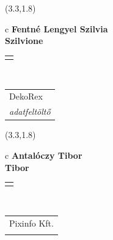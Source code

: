 \documentclass[11pt]{article}
\begin{document}
\makebox(3.3,1.8){
  \renewcommand\arraystretch{1.3}
  \begin{tabular}[c]{c}
    \hspace{8.5mm}
    \LARGE\bf{ Fentné Lengyel Szilvia }\\
    \hspace{8.5mm}
    \Large{ Szilvione }\\
    \renewcommand\arraystretch{3}
    \begin{tabular}[c]{c}
      \centering
      \fontfamily{phv}\selectfont{
        \textbf{
          \textsc{
            \scriptsize{
            \color{Dark}{ Ismerkedő }\color{Bright}{ Webmester }\color{Bright}{ Sminkmester }\color{Bright}{ Programozó }
            }
          }
        }
      }
    \end{tabular}
    \\
    \renewcommand\arraystretch{1}
    \begin{tabular}{p{3.3in}}
      \hspace{.7cm}DekoRex\\
      \hspace{.7cm}\emph{ adatfeltöltő }\\
    \end{tabular}
  \end{tabular}
}

\makebox(3.3,1.8){
  \renewcommand\arraystretch{1.3}
  \begin{tabular}[c]{c}
    \hspace{8.5mm}
    \LARGE\bf{ Antalóczy Tibor }\\
    \hspace{8.5mm}
    \Large{ Tibor }\\
    \renewcommand\arraystretch{3}
    \begin{tabular}[c]{c}
      \centering
      \fontfamily{phv}\selectfont{
        \textbf{
          \textsc{
            \scriptsize{
            \color{Dark}{ Ismerkedő }\color{Bright}{ Webmester }\color{Bright}{ Sminkmester }\color{Bright}{ Programozó }
            }
          }
        }
      }
    \end{tabular}
    \\
    \renewcommand\arraystretch{1}
    \begin{tabular}{p{3.3in}}
      \hspace{.7cm}Pixinfo Kft.\\
      \hspace{.7cm}\emph{  }\\
    \end{tabular}
  \end{tabular}
}
\end{document}
